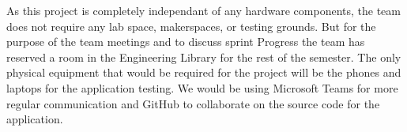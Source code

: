 As this project is completely independant of any hardware components, the team does not require any lab space, makerspaces, or testing grounds. But for the purpose of the team meetings and to discuss sprint  Progress the team has reserved a room in the Engineering Library for the rest of the semester. The only physical equipment that would be required for the project will be the phones and laptops for the application testing. We would be using Microsoft Teams for more regular communication and GitHub to collaborate on the source code for the application.